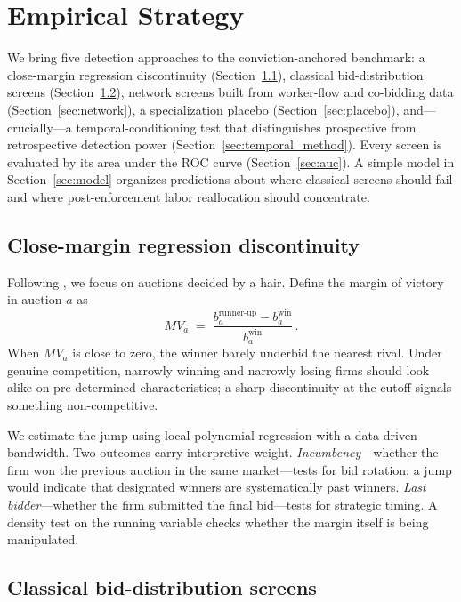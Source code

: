 \section{Empirical Strategy}\label{coll}

We bring five detection approaches to the conviction-anchored benchmark: a close-margin regression discontinuity (Section~\ref{sec:rdd}), classical bid-distribution screens (Section~\ref{sec:classical}), network screens built from worker-flow and co-bidding data (Section~\ref{sec:network}), a specialization placebo (Section~\ref{sec:placebo}), and---crucially---a temporal-conditioning test that distinguishes prospective from retrospective detection power (Section~\ref{sec:temporal_method}). Every screen is evaluated by its area under the ROC curve (Section~\ref{sec:auc}). A simple model in Section~\ref{sec:model} organizes predictions about where classical screens should fail and where post-enforcement labor reallocation should concentrate.

\subsection{Close-margin regression discontinuity}\label{sec:rdd}

Following \citet{kawai2023using}, we focus on auctions decided by a hair. Define the margin of victory in auction $a$ as
\[
MV_a \;=\; \frac{b^{\text{runner-up}}_a - b^{\text{win}}_a}{b^{\text{win}}_a}\,.
\]
When $MV_a$ is close to zero, the winner barely underbid the nearest rival. Under genuine competition, narrowly winning and narrowly losing firms should look alike on pre-determined characteristics; a sharp discontinuity at the cutoff signals something non-competitive.

We estimate the jump using local-polynomial regression with a data-driven bandwidth. Two outcomes carry interpretive weight. \emph{Incumbency}---whether the firm won the previous auction in the same market---tests for bid rotation: a jump would indicate that designated winners are systematically past winners. \emph{Last bidder}---whether the firm submitted the final bid---tests for strategic timing. A density test on the running variable checks whether the margin itself is being manipulated.

\subsection{Classical bid-distribution screens}\label{sec:classical}

